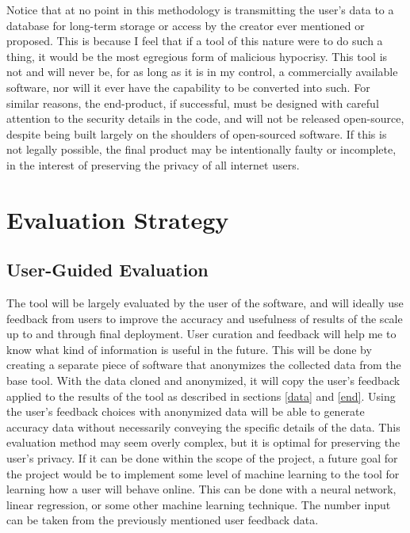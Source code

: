 \documentclass[11pt]{article}
\begin{document}
Notice that at no point in this methodology is transmitting the user's data to a database for long-term storage or access by the creator ever mentioned or proposed. This is because I feel that if a tool of this nature were to do such a thing, it would be the most egregious form of malicious hypocrisy. This tool is not and will never be, for as long as it is in my control, a commercially available software, nor will it ever have the capability to be converted into such. For similar reasons, the end-product, if successful, must be designed with careful attention to the security details in the code, and will not be released open-source, despite being built largely on the shoulders of open-sourced software. If this is not legally possible, the final product may be intentionally faulty or incomplete, in the interest of preserving the privacy of all internet users.

\vspace*{-.2in}
\section{Evaluation Strategy}
\label{sec:evaluate}
\vspace*{-.1in}


\subsection{User-Guided Evaluation} \label{sec:user}
The tool will be largely evaluated by the user of the software, and will ideally use feedback from users to improve the accuracy and usefulness of results of the scale up to and through final deployment. User curation and feedback will help me to know what kind of information is useful in the future. This will be done by creating a separate piece of software that anonymizes the collected data from the base tool. With the data cloned and anonymized, it will copy the user's feedback applied to the results of the tool as described in sections \ref{data} and \ref{end}. Using the user's feedback choices with anonymized data will be able to generate accuracy data without necessarily conveying the specific details of the data. This evaluation method may seem overly complex, but it is optimal for preserving the user's privacy. If it can be done within the scope of the project, a future goal for the project would be to implement some level of machine learning to the tool for learning how a user will behave online. This can be done with a neural network, linear regression, or some other machine learning technique. The number input can be taken from the previously mentioned user feedback data. 
\end{document}
